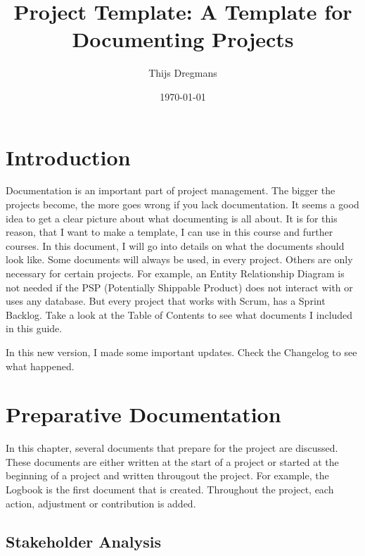\documentclass[10pt]{report}
\title{Project Template: A Template for Documenting Projects}
\date{\today}
\author{Thijs Dregmans}
\begin{document}
\maketitle

\chapter{Introduction}
\thispagestyle{fancy}

Documentation is an important part of project management. The bigger the projects become, the more goes wrong if you lack documentation. It seems a good idea to get a clear picture about what documenting is all about. It is for this reason, that I want to make a template, I can use in this course and further courses. In this document, I will go into details on what the documents should look like. Some documents will always be used, in every project. Others are only necessary for certain projects. For example, an Entity Relationship Diagram is not needed if the PSP (Potentially Shippable Product) does not interact with or uses any database. But every project that works with Scrum, has a Sprint Backlog. Take a look at the Table of Contents to see what documents I included in this guide.

In this new version, I made some important updates. Check the Changelog to see what happened.

\newpage

\tableofcontents

\newpage

\chapter{Preparative Documentation}
\thispagestyle{fancy}

In this chapter, several documents that prepare for the project are discussed. These documents are either written at the start of a project or started at the beginning of a project and written througout the project. For example, the Logbook is the first document that is created. Throughout the project, each action, adjustment or contribution is added.

\medskip
\minitoc

\newpage

\section{Stakeholder Analysis}
\end{document}
